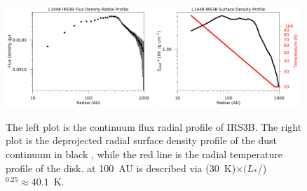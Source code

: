 \begin{figure}[H]
\begin{center}
\includegraphics[width=0.49\textwidth]{img/L1448N-dgr-linear-intensity-c17o_cont.pdf}
\includegraphics[width=0.49\textwidth]{img/L1448N-dustgas-surface-density-loglog.pdf}
\end{center}
\caption{The left plot is the continuum flux  radial profile of IRS3B. The right plot is the deprojected radial surface density profile of the dust continuum in black , while the red line is the radial temperature profile of the disk.  at 100~AU is described via (30~K)$\times(L_{*}$/\lsun)$^{0.25}\approx40.1$~K.}\label{fig:surfacedensity}
\end{figure}

